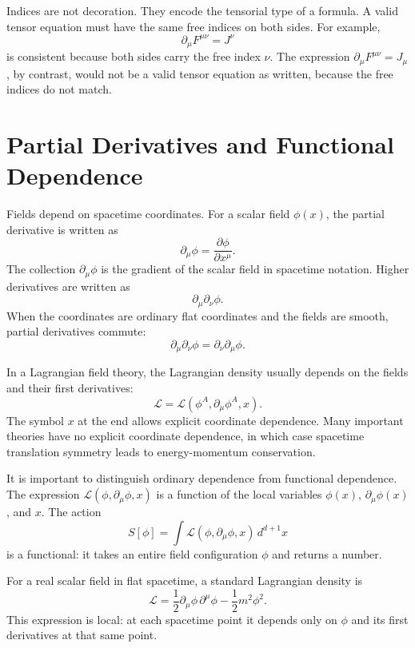 Indices are not decoration. They encode the tensorial type of a formula. A
valid tensor equation must have the same free indices on both sides. For
example,
\[
    \partial_\mu F^{\mu\nu} = J^\nu
\]
is consistent because both sides carry the free index \(\nu\). The expression
\(\partial_\mu F^{\mu\nu}=J_\mu\), by contrast, would not be a valid tensor
equation as written, because the free indices do not match.

\section{Partial Derivatives and Functional Dependence}

Fields depend on spacetime coordinates. For a scalar field \(\phi(x)\), the
partial derivative is written as
\[
    \partial_\mu \phi = \frac{\partial \phi}{\partial x^\mu}.
\]
The collection \(\partial_\mu\phi\) is the gradient of the scalar field in
spacetime notation. Higher derivatives are written as
\[
    \partial_\mu\partial_\nu \phi.
\]
When the coordinates are ordinary flat coordinates and the fields are smooth,
partial derivatives commute:
\[
    \partial_\mu\partial_\nu\phi = \partial_\nu\partial_\mu\phi.
\]

In a Lagrangian field theory, the Lagrangian density usually depends on the
fields and their first derivatives:
\[
    \mathcal{L}=\mathcal{L}(\phi^A,\partial_\mu\phi^A,x).
\]
The symbol \(x\) at the end allows explicit coordinate dependence. Many
important theories have no explicit coordinate dependence, in which case
spacetime translation symmetry leads to energy-momentum conservation.

It is important to distinguish ordinary dependence from functional dependence.
The expression \(\mathcal{L}(\phi,\partial_\mu\phi,x)\) is a function of the
local variables \(\phi(x)\), \(\partial_\mu\phi(x)\), and \(x\). The action
\[
    S[\phi] = \int \mathcal{L}(\phi,\partial_\mu\phi,x)\,d^{d+1}x
\]
is a functional: it takes an entire field configuration \(\phi\) and returns a
number.

\begin{examplebox}
For a real scalar field in flat spacetime, a standard Lagrangian density is
\[
    \mathcal{L}
    = \frac{1}{2}\partial_\mu\phi\,\partial^\mu\phi
      - \frac{1}{2}m^2\phi^2.
\]
This expression is local: at each spacetime point it depends only on \(\phi\) and
its first derivatives at that same point.
\end{examplebox}

